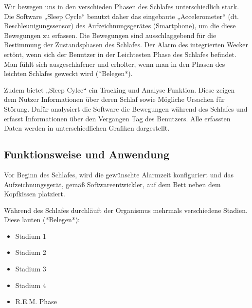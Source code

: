 Wir bewegen uns in den verschieden Phasen des Schlafes unterschiedlich stark. Die Software „Sleep Cycle“ benutzt daher das eingebaute „Accelerometer“ (dt. Beschleunigungssensor) des Aufzeichnungsgerätes (Smartphone), um die diese Bewegungen zu erfassen. Die Bewegungen sind ausschlaggebend für die Bestimmung der Zustandsphasen des Schlafes.
Der Alarm des integrierten Wecker ertönt, wenn sich der Benutzer in der Leichtesten Phase des Schlafes befindet.
Man fühlt sich ausgeschlafener und erholter, wenn man in den Phasen des leichten Schlafes geweckt wird (*Belegen*). 




Zudem bietet „Sleep Cylce“ ein Tracking und Analyse Funktion.
Diese zeigen dem Nutzer Informationen über deren Schlaf sowie Mögliche Ursachen für Störung.
Dafür analysiert die Software die Bewegungen während des Schlafes und erfasst Informationen über den Vergangen Tag des Benutzers.
Alle erfassten Daten werden in unterschiedlichen Grafiken dargestellt.




\subsection{Funktionsweise und Anwendung}
\label{ch:Apps:sec:Sleepcycle:subsec:FuA}

Vor Beginn des Schlafes, wird die gewünschte Alarmzeit konfiguriert und das Aufzeichnungsgerät, gemäß Softwareentwickler, auf dem Bett neben dem Kopfkissen platziert. 

Während des Schlafes durchläuft der Organismus mehrmals verschiedene Stadien. Diese lauten (*Belegen*):

\begin{itemize}
	\item Stadium 1
	\item Stadium 2
	\item Stadium 3
	\item Stadium 4
	\item R.E.M. Phase
\end{itemize}


